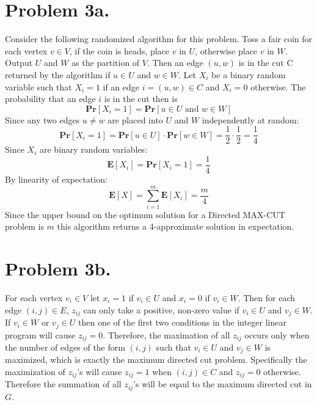 \documentclass[12pt]{article}
\begin{document}
\pagestyle{plain}
\titleformat{\subsection}[runin]
  {\normalfont\large\bfseries}{\thesubsection}{1em}{}
\titleformat{\subsubsection}[runin]
  {\normalfont\large\bfseries}{\thesubsubsection}{1em}{}

\section*{Problem 3a.}

Consider the following randomized algorithm for this problem. Toss a fair coin
for each vertex $v\in V$, if the coin is heads, place $v$ in $U$, otherwise
place $v$ in $W$. Output $U$ and $W$ as the partition of $V$. Then an edge
$(u,w)$ is in the cut C returned by the algorithm if $u\in U$ and $w \in W$.
Let $X_i$ be a binary random variable such that $X_i = 1$ if an edge
$i = (u,w) \in C$ and $X_i = 0$ otherwise. The probability that an edge $i$
is in the cut then is
$$\textbf{Pr}[X_i = 1] = \textbf{Pr}[u \in U \text{ and } w\in W]$$
Since any two edges $u \neq w$ are placed into $U$ and $W$ independently at
random: $$\textbf{Pr}[X_i = 1] = \textbf{Pr}[u \in U]\cdot\textbf{Pr}[w\in W] =
\frac{1}{2}\cdot\frac{1}{2} = \frac{1}{4}$$
Since $X_i$ are binary random variables:
$$\textbf{E}[X_i] = \textbf{Pr}[X_i = 1] = \frac{1}{4}$$
By linearity of expectation:
$$\textbf{E}[X] = \sum^m_{i=1} \textbf{E}[X_i] = \frac{m}{4}$$
Since the upper bound on the optimum solution for a Directed MAX-CUT problem is
$m$ this algorithm returns a 4-approximate solution in expectation.

\section*{Problem 3b.}
For each vertex $v_i \in V$ let $x_i = 1$ if $v_i \in U$ and $x_i = 0$ if
$v_i \in W$. Then for each edge $(i,j) \in E$, $z_{ij}$ can only take a positive,
non-zero value if $v_i \in U$ and $v_j \in W$. If $v_i \in W$ or $v_j \in U$
then one of the first two conditions in the integer linear program will cause
$z_{ij} = 0$. Therefore, the maximation of all $z_{ij}$ occurs only when the number
of edges of the form $(i,j)$ such that $v_i \in U$ and $v_j \in W$ is maximized,
which is exactly the maximum directed cut problem. Specifically the maximization
of $z_{ij}$'s will cause $z_{ij} = 1$ when $(i,j) \in C$ and $z_{ij} = 0$
otherwise. Therefore the summation of all $z_{ij}$'s will be eqaul to the
maximum directed cut in $G$.
\end{document}
